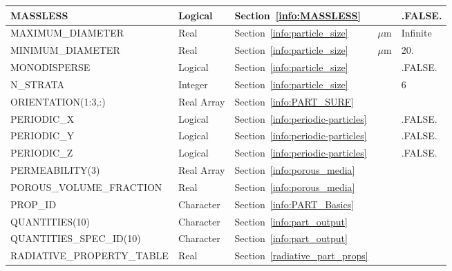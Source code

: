 \documentclass[11pt]{book}
\begin{document}
\begin{longtable}{@{\extracolsep{\fill}}|l|l|l|l|l|}
{\ct MASSLESS}                           & Logical         & Section~\ref{info:MASSLESS}             &           & {\ct .FALSE.} \\ \hline
{\ct MAXIMUM\_DIAMETER}                  & Real            & Section~\ref{info:particle_size}        & $\mu$m    & Infinite      \\ \hline
{\ct MINIMUM\_DIAMETER}                  & Real            & Section~\ref{info:particle_size}        & $\mu$m    & 20.           \\ \hline
{\ct MONODISPERSE}                       & Logical         & Section~\ref{info:particle_size}        &           & {\ct .FALSE.} \\ \hline
{\ct N\_STRATA}                          & Integer         & Section~\ref{info:particle_size}        &           & 6             \\ \hline
{\ct ORIENTATION(1:3,:)}                 & Real Array      & Section~\ref{info:PART_SURF}            &           &               \\ \hline
{\ct PERIODIC\_X}                        & Logical         & Section~\ref{info:periodic-particles}   &           & {\ct .FALSE.} \\ \hline
{\ct PERIODIC\_Y}                        & Logical         & Section~\ref{info:periodic-particles}   &           & {\ct .FALSE.} \\ \hline
{\ct PERIODIC\_Z}                        & Logical         & Section~\ref{info:periodic-particles}   &           & {\ct .FALSE.} \\ \hline
{\ct PERMEABILITY(3)}                    & Real Array      & Section~\ref{info:porous_media}         &           &               \\ \hline
{\ct POROUS\_VOLUME\_FRACTION}           & Real            & Section~\ref{info:porous_media}         &           &               \\ \hline
{\ct PROP\_ID}                           & Character       & Section~\ref{info:PART_Basics}          &           &               \\ \hline
{\ct QUANTITIES(10)}                     & Character       & Section~\ref{info:part_output}          &           &               \\ \hline
{\ct QUANTITIES\_SPEC\_ID(10)}           & Character       & Section~\ref{info:part_output}          &           &               \\ \hline
{\ct RADIATIVE\_PROPERTY\_TABLE}         & Real            & Section~\ref{radiative_part_props}      &           &               \\ \hline

\end{longtable}
\end{document}
